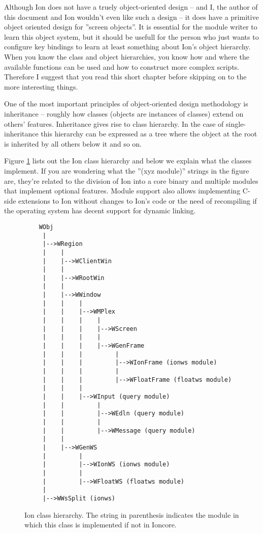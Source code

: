 
\label{chap:prelim}

Although Ion does not have a truely object-oriented design -- and I,
the author of this document and Ion wouldn't even like such a design -- 
it does have a primitive object oriented design for ''screen objects''.
It is essential for the module writer to learn this object system,
but it should be usefull for the person who just wants to configure
key bindings to learn at least something about Ion's object hierarchy.
When you know the class and object hierarchies, you know how and where
the available functions can be used and how to construct more complex
scripts. Therefore I suggest that you read this short chapter before
skipping on to the more interesting things.



One of the most important principles of object-oriented design methodology
is inheritance -- roughly how classes (objects are instances of classes)
extend on others' features. Inheritance gives rise to class hierarchy.
In the case of single-inheritance this hierarchy can be expressed as a
tree where the object at the root is inherited by all others below it
and so on.

Figure \ref{fig:classhierarchy} lists out the Ion class hierarchy and below
we explain what the classes implement. If you are wondering what the 
''(xyz module)'' strings in the figure are, they're related to the 
division of Ion into a core binary and multiple modules that implement
optional features. Module support also allows implementing  C-side
extensions to Ion without changes to Ion's code or the need of 
recompiling if the operating system has decent support for dynamic 
linking.

\begin{figure}
\begin{verbatim}
    WObj
     |
     |-->WRegion
     |    |
     |    |-->WClientWin
     |    |
     |    |-->WRootWin
     |    |
     |    |-->WWindow
     |    |    |
     |    |    |-->WMPlex
     |    |    |    |
     |    |    |    |-->WScreen
     |    |    |    |
     |    |    |    |-->WGenFrame
     |    |    |         |
     |    |    |         |-->WIonFrame (ionws module)
     |    |    |         |
     |    |    |         |-->WFloatFrame (floatws module)
     |    |    |
     |    |    |-->WInput (query module)
     |    |         |
     |    |         |-->WEdln (query module)
     |    |         |
     |    |         |-->WMessage (query module)
     |    |
     |    |-->WGenWS
     |         |
     |         |-->WIonWS (ionws module)
     |         |
     |         |-->WFloatWS (floatws module)
     |
     |-->WWsSplit (ionws)
\end{verbatim}
\caption{Ion class hierarchy. The string in parenthesis indicates
  the module in which this class is implemented if not in Ioncore.}
\label{fig:classhierarchy}
\end{figure}

